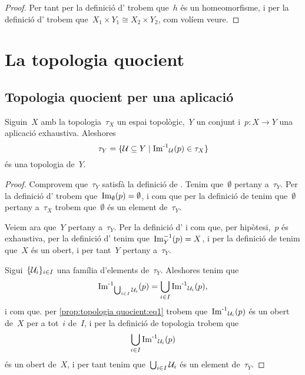 \documentclass[../../main.tex]{subfiles}
\begin{document}
\begin{proposition}
\begin{proof}
            Per tant per la definició d' trobem que~\(h\) és un homeomorfisme, i per la definició d' trobem que~\(X_{1}\times Y_{1}\cong X_{2}\times Y_{2}\), com volíem veure.
        \end{proof}
    \end{proposition}
\section{La topologia quocient}
    \subsection{Topologia quocient per una aplicació}
    \begin{proposition}
        \label{prop:topologia quocient}
        Siguin~\(X\) amb la topologia~\(\tau_{X}\) un espai topològic,~\(Y\) un conjunt i~\(p\colon X\longrightarrow Y\) una aplicació exhaustiva.
        Aleshores
        \begin{equation}
            \label{prop:topologia quocient:eq1}
            \tau_{Y}=\{\mathcal{U}\subseteq Y\mid\operatorname{\operatorname{Im}^{-1}}_{\mathcal{U}}(p)\in\tau_{X}\}
        \end{equation}
        és una topologia de~\(Y\).
        \begin{proof} %
            Comprovem que~\(\tau_{Y}\) satisfà la definició de .
            Tenim que~\(\emptyset\) pertany a~\(\tau_{Y}\).
            Per la definició d' trobem que~\(\operatorname{Im}_{\emptyset}(p)=\emptyset\), i com que per la definició de  tenim que~\(\emptyset\) pertany a~\(\tau_{X}\) trobem que~\(\emptyset\) és un element de~\(\tau_{Y}\).

            Veiem ara que~\(Y\) pertany a~\(\tau_{Y}\).
            Per la definició d' i com que, per hipòtesi,~\(p\) és exhaustiva, per la definició d' tenim que~\(\operatorname{Im}_{Y}^{-1}(p)=X\), i per la definició de  tenim que~\(X\) és un obert, i per tant~\(Y\) pertany a~\(\tau_{Y}\).

            Sigui~\(\{\mathcal{U}_{i}\}_{i\in I}\) una família d'elements de~\(\tau_{Y}\).
            Aleshores tenim que
            \[
                \operatorname{\operatorname{Im}^{-1}}_{\bigcup_{i\in I}\mathcal{U}_{i}}(p)=\bigcup_{i\in I}\operatorname{\operatorname{Im}^{-1}}_{\mathcal{U}_{i}}(p),
            \]
            i com que.
            per \eqref{prop:topologia quocient:eq1} trobem que~\(\operatorname{\operatorname{Im}^{-1}}_{\mathcal{U}_{i}}(p)\) és un obert de~\(X\) per a tot~\(i\) de~\(I\), i per la definició de topologia trobem que
            \[
                \bigcup_{i\in I}\operatorname{\operatorname{Im}^{-1}}_{\mathcal{U}_{i}}(p)
            \]
            és un obert de~\(X\), i per tant tenim que~\(\bigcup_{i\in I}\mathcal{U}_{i}\) és un element de~\(\tau_{Y}\).


\end{proof}
\end{proposition}
\end{document}
